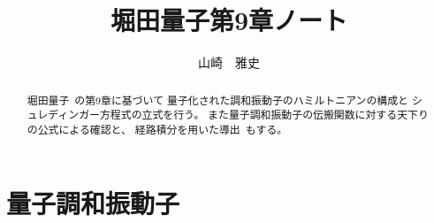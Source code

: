 \documentclass[a4paper,10pt]{ltjsarticle}
\title{堀田量子第9章ノート}
\author{山崎　雅史}
\begin{document}
\maketitle
\begin{abstract}
  堀田量子~\cite{hotta2021qm}の第9章に基づいて
  量子化された調和振動子のハミルトニアンの構成と
  シュレディンガー方程式の立式を行う。
  また量子調和振動子の伝搬関数に対する天下りの公式による確認と、
  経路積分を用いた導出~\cite{osborn2014aqft}もする。
\end{abstract}
\tableofcontents

\setcounter{section}{8}

\section{量子調和振動子}

\setcounter{subsection}{-1}






\newpage

\end{document}
